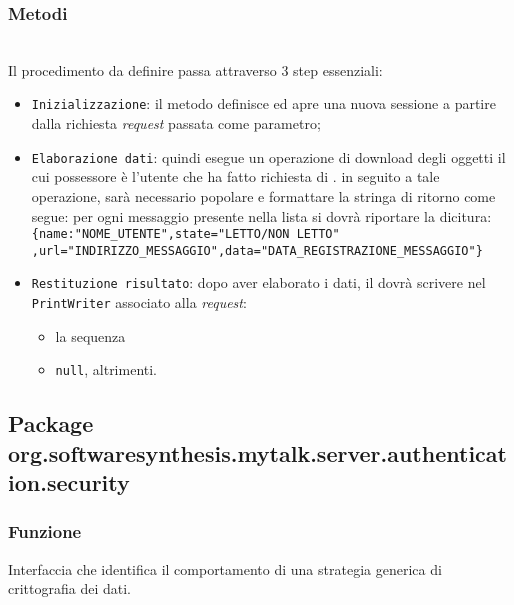 \subsubsection*{Metodi}
\begin{description}
	\item{}\\
	Il procedimento da definire passa attraverso 3 step essenziali:
	\begin{itemize}
		\item \texttt{Inizializzazione}: il metodo definisce ed apre una nuova sessione a partire dalla richiesta \textit{request} passata come parametro;
		\item \texttt{Elaborazione dati}: quindi esegue un operazione di download degli oggetti  il cui possessore è l'utente che ha fatto richiesta di . in seguito a tale operazione, sarà necessario popolare e formattare la stringa di ritorno come segue: per ogni messaggio presente nella lista si dovrà riportare la dicitura:\\
		
		\verb|{name:"NOME_UTENTE",state="LETTO/NON LETTO"|\\
		\verb|,url="INDIRIZZO_MESSAGGIO",data="DATA_REGISTRAZIONE_MESSAGGIO"}|\\
	
		\item \texttt{Restituzione risultato}: dopo aver elaborato i dati, il  dovrà scrivere nel \texttt{PrintWriter} associato alla \textit{request}:
			\begin{itemize}
				\item la sequenza
				\item \texttt{null}, altrimenti.
			\end{itemize}
	\end{itemize}

\end{description}

\subsection{Package org.softwaresynthesis.mytalk.server.authentication.security}\label{sec:authentication}


\subsubsection*{Funzione}
Interfaccia che identifica il comportamento di una strategia generica di crittografia dei dati.

